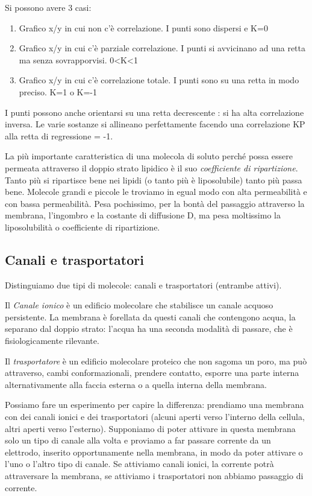 \documentclass[a4paper,12pt]{article}
\begin{document}
Si possono avere 3 casi:
\begin{enumerate}
\item{Grafico x/y in cui non c'è correlazione. I punti sono dispersi e K=0}
\item{Grafico x/y in cui c’è parziale correlazione. I punti si avvicinano ad una retta ma senza sovrapporvisi. 0<K<1}
\item{Grafico x/y in cui c’è correlazione totale. I punti sono su una retta in modo preciso. K=1 o K=-1}
\end{enumerate} 

I punti possono anche orientarsi su una retta decrescente : si ha alta correlazione inversa. Le varie sostanze si allineano perfettamente facendo una correlazione KP alla retta di regressione = -1.

La più importante caratteristica di una molecola di soluto perché possa essere permeata attraverso il doppio strato lipidico è il suo \emph{coefficiente di ripartizione}. Tanto più si ripartisce bene nei lipidi (o tanto più è liposolubile) tanto più passa bene.
Molecole grandi e piccole le troviamo in egual modo con alta permeabilità e con bassa permeabilità. Pesa pochissimo, per la bontà del passaggio attraverso la membrana, l'ingombro e la costante di diffusione D, ma pesa moltissimo la liposolubilità o coefficiente di ripartizione.

\subsection{Canali e trasportatori}
Distinguiamo due tipi di molecole: canali e trasportatori (entrambe attivi).

Il \emph{Canale ionico} è un edificio molecolare che stabilisce un canale acquoso persistente. La membrana è forellata da questi canali che contengono acqua, la separano dal doppio strato: l'acqua ha una seconda modalità di passare, che è fisiologicamente rilevante. 

Il \emph{trasportatore} è un edificio molecolare proteico che non sagoma un poro, ma può attraverso, cambi conformazionali, prendere contatto, esporre una parte interna alternativamente alla faccia esterna o a quella interna della membrana.

Possiamo fare un esperimento per capire la differenza: prendiamo una membrana con dei
canali ionici e dei trasportatori (alcuni aperti verso l'interno della cellula, altri aperti verso
l'esterno). Supponiamo di poter attivare in questa membrana solo un tipo di canale alla
volta e proviamo a far passare corrente da un elettrodo, inserito opportunamente nella
membrana, in modo da poter attivare o l'uno o l'altro tipo di canale. Se attiviamo canali ionici, la corrente potrà attraversare la membrana, se attiviamo i trasportatori non abbiamo
passaggio di corrente.
\end{document}
